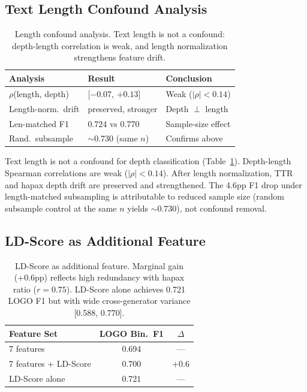 \documentclass[11pt,a4paper]{article}
\begin{document}
\subsection{Text Length Confound Analysis}
\label{sec:length}

\begin{table}[t]
\centering
\small
\begin{tabular}{lll}
\toprule
\textbf{Analysis} & \textbf{Result} & \textbf{Conclusion} \\
\midrule
$\rho$(length, depth) & [$-0.07$, $+0.13$] & Weak ($|\rho| < 0.14$) \\
Length-norm.\ drift & preserved, stronger & Depth $\perp$ length \\
Len-matched F1 & 0.724 vs 0.770 & Sample-size effect \\
Rand.\ subsample & ${\sim}$0.730 (same $n$) & Confirms above \\
\bottomrule
\end{tabular}
\caption{Length confound analysis. Text length is not a confound: depth-length correlation is weak, and length normalization strengthens feature drift.}
\label{tab:length}
\end{table}

Text length is not a confound for depth classification (Table~\ref{tab:length}). Depth-length Spearman correlations are weak ($|\rho| < 0.14$). After length normalization, TTR and hapax depth drift are preserved and strengthened. The 4.6pp F1 drop under length-matched subsampling is attributable to reduced sample size (random subsample control at the same $n$ yields ${\sim}$0.730), not confound removal.

\subsection{LD-Score as Additional Feature}
\label{sec:ldscore}

\begin{table}[t]
\centering
\small
\begin{tabular}{lcc}
\toprule
\textbf{Feature Set} & \textbf{LOGO Bin.~F1} & \textbf{$\Delta$} \\
\midrule
7 features & 0.694 & --- \\
7 features + LD-Score & 0.700 & $+0.6$ \\
LD-Score alone & 0.721 & --- \\
\bottomrule
\end{tabular}
\caption{LD-Score as additional feature. Marginal gain (+0.6pp) reflects high redundancy with hapax ratio ($r = 0.75$). LD-Score alone achieves 0.721 LOGO F1 but with wide cross-generator variance [0.588, 0.770].}
\label{tab:ldscore}
\end{table}
\end{document}
